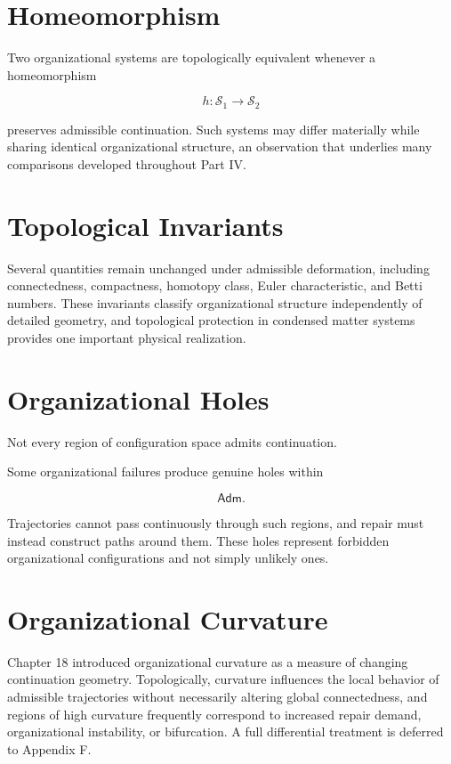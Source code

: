 \documentclass[11pt,oneside]{book}
\numberwithin{equation}{chapter}
\theoremstyle{definition}
\theoremstyle{plain}
\newcommand{\Adm}{\mathsf{Adm}}
\begin{document}
\section{Homeomorphism}

Two organizational systems are topologically equivalent whenever a
homeomorphism

\[
h
:
\mathcal S_1
\rightarrow
\mathcal S_2
\]

preserves admissible continuation. Such systems may differ materially while sharing identical organizational structure, an observation that underlies many comparisons developed throughout Part IV.

\section{Topological Invariants}

Several quantities remain unchanged under admissible deformation, including connectedness, compactness, homotopy class, Euler characteristic, and Betti numbers. These invariants classify organizational structure independently of detailed geometry, and topological protection in condensed matter systems provides one important physical realization.

\section{Organizational Holes}

Not every region of configuration space admits continuation.

Some organizational failures produce genuine holes within

\[
\Adm.
\]

Trajectories cannot pass continuously through such regions, and repair must instead construct paths around them. These holes represent forbidden organizational configurations and not simply unlikely ones.

\section{Organizational Curvature}

Chapter 18 introduced organizational curvature as a measure of changing continuation geometry. Topologically, curvature influences the local behavior of admissible trajectories without necessarily altering global connectedness, and regions of high curvature frequently correspond to increased repair demand, organizational instability, or bifurcation. A full differential treatment is deferred to Appendix F.
\end{document}
